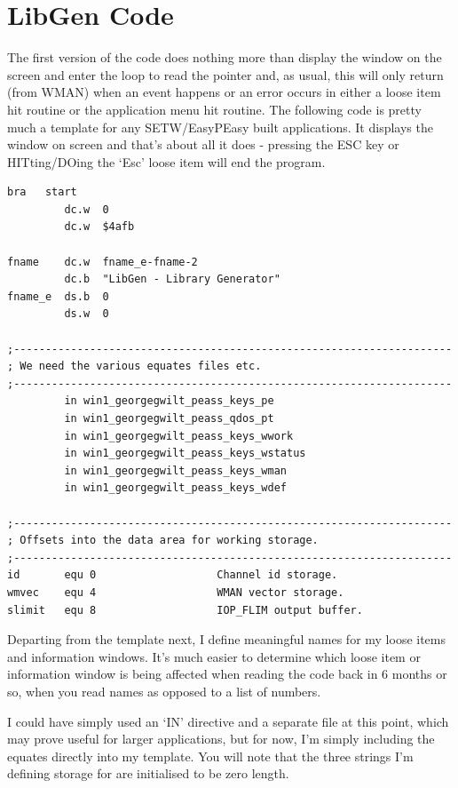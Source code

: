 \section{LibGen Code}

The first version of the code does nothing more than display the
    window on the screen and enter the loop to read the pointer and, as usual,
    this will only return (from WMAN) when an event
    happens or an error occurs in either a loose item hit routine or the
    application menu hit routine. The following code is pretty much a template
    for any
 SETW/EasyPEasy built
    applications. It displays the window on screen and that's about all it
    does -{} pressing the ESC key or HITting/DOing the `Esc' loose item will end
    the program.

\begin{lstlisting}[firstnumber=1,]
         bra   start
         dc.w  0
         dc.w  $4afb

fname    dc.w  fname_e-fname-2
         dc.b  "LibGen - Library Generator"
fname_e  ds.b  0
         ds.w  0

;---------------------------------------------------------------------
; We need the various equates files etc.
;---------------------------------------------------------------------
         in win1_georgegwilt_peass_keys_pe
         in win1_georgegwilt_peass_qdos_pt
         in win1_georgegwilt_peass_keys_wwork
         in win1_georgegwilt_peass_keys_wstatus
         in win1_georgegwilt_peass_keys_wman
         in win1_georgegwilt_peass_keys_wdef

;---------------------------------------------------------------------
; Offsets into the data area for working storage.
;---------------------------------------------------------------------
id       equ 0                   Channel id storage.
wmvec    equ 4                   WMAN vector storage.
slimit   equ 8                   IOP_FLIM output buffer.
\end{lstlisting}

Departing from the template next, I define meaningful names for my
    loose items and information windows. It's much easier to determine which
    loose item or information window is being affected when reading the code
    back in 6 months or so, when you read names as opposed to a list of
    numbers.

I could have simply used an `IN' directive and a separate file at
    this point, which may prove useful for larger applications, but for now,
    I'm simply including the equates directly into my template. You will note
    that the three strings I'm defining storage for are initialised to be zero
    length.

